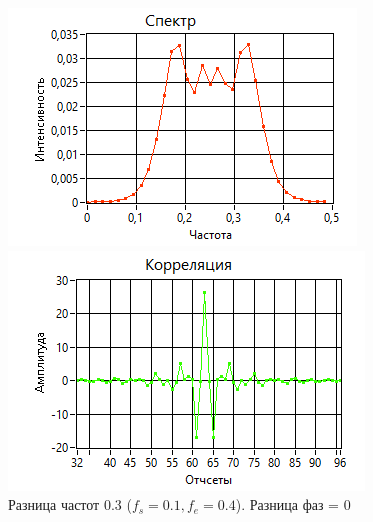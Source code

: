 \begin{figure}[h!]
    \centering
    \begin{minipage}{0.49\linewidth}
        \includegraphics[width =0.9\linewidth]{imgs/spec2.png}
    \end{minipage}
    \begin{minipage}{0.49\linewidth}
        \includegraphics[width =0.9\linewidth]{imgs/corr2.png}
    \end{minipage}
	\caption{Разница частот 0.3 ($f_{s}=0.1, f_{e}=0.4$). Разница фаз = 0}
	\label{fig:spec2}
\end{figure}

